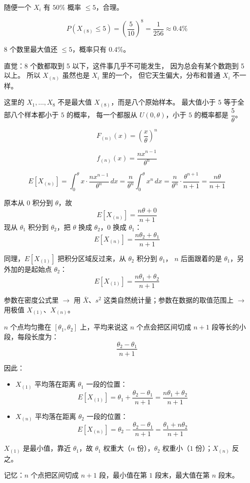 \begin{note}[顺序统计量]
\begin{example}
随便一个 $X_i$ 有 $50\%$ 概率 $\leq 5$，合理。

$$P(X_{(8)} \leq 5) = \left(\frac{5}{10}\right)^8 = \frac{1}{256} \approx 0.4\%$$

8 个数里最大值还 $\leq 5$，概率只有 $0.4\%$。

直觉：8 个数都取到 5 以下，这件事几乎不可能发生，
因为总会有某个数跑到 5 以上。
所以 $X_{(n)}$ 虽然也是 $X_i$ 里的一个，
但它天生偏大，分布和普通 $X_i$ 不一样。
\end{example}
\begin{dxtips}
    这里的 $X_1, \dots, X_8$ 不是最大值 $X_{(8)}$，而是八个原始样本。
最大值小于 $5$ 等于全部八个样本都小于 $5$ 的概率，
每一个都服从 $U(0,\theta)$，小于 $5$ 的概率都是 $\dfrac{5}{\theta}$。
\end{dxtips}
\begin{note}
$$F_{(n)}(x) = \left(\frac{x}{\theta}\right)^n$$

$$f_{(n)}(x) = \frac{nx^{n-1}}{\theta^n}$$

$$E[X_{(n)}] = \int_0^\theta x \cdot \frac{nx^{n-1}}{\theta^n}\,dx 
= \frac{n}{\theta^n}\int_0^\theta x^n\,dx 
= \frac{n}{\theta^n} \cdot \frac{\theta^{n+1}}{n+1} 
= \frac{n\theta}{n+1}$$
\end{note}

\begin{dxtips}
    原本从 $0$ 积分到 $\theta$，故
$$E[X_{(n)}] = \frac{n\theta + 0}{n+1}$$
现从 $\theta_1$ 积分到 $\theta_2$，把 $\theta$ 换成 $\theta_2$，$0$ 换成 $\theta_1$：
$$E[X_{(n)}] = \frac{n\theta_2 + \theta_1}{n+1}$$

同理，$E[X_{(1)}]$ 把积分区域反过来，从 $\theta_2$ 积分到 $\theta_1$，
$n$ 后面跟着的是 $\theta_1$，另外加的是起始点 $\theta_2$：
$$E[X_{(1)}] = \frac{n\theta_1 + \theta_2}{n+1}$$
\end{dxtips}
\begin{note}

参数在密度公式里 $\rightarrow$ 用 $\bar{X}$、$s^2$ 这类自然统计量；参数在数据的取值范围上 $\rightarrow$ 用极值 $X_{(1)}$、$X_{(n)}$。
\end{note}
\begin{note}[顺序统计量期望的等间距直觉]
$n$ 个点均匀撒在 $[\theta_1, \theta_2]$ 上，平均来说这 $n$ 个点会把区间切成 $n+1$ 段等长的小段，每段长度为：
$$\frac{\theta_2 - \theta_1}{n+1}$$

因此：
\begin{itemize}
  \item $X_{(1)}$ 平均落在距离 $\theta_1$ 一段的位置：
  $$E[X_{(1)}] = \theta_1 + \frac{\theta_2-\theta_1}{n+1} = \frac{n\theta_1+\theta_2}{n+1}$$

  \item $X_{(n)}$ 平均落在距离 $\theta_2$ 一段的位置：
  $$E[X_{(n)}] = \theta_2 - \frac{\theta_2-\theta_1}{n+1} = \frac{\theta_1+n\theta_2}{n+1}$$
\end{itemize}

$X_{(1)}$ 是最小值，靠近 $\theta_1$，故 $\theta_1$ 权重大（$n$ 份），$\theta_2$ 权重小（$1$ 份）；$X_{(n)}$ 反之。

记忆：$n$ 个点把区间切成 $n+1$ 段，最小值在第 $1$ 段末，最大值在第 $n$ 段末。
\end{note}
\end{note}
